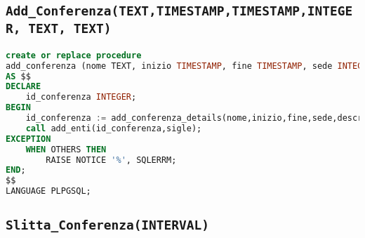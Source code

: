 \subsection{\texttt{Add\_Conferenza(TEXT,TIMESTAMP,TIMESTAMP,INTEGER, TEXT, TEXT)}}
\begin{lstlisting}[language=SQL,style=mystyle]
create or replace procedure 
add_conferenza (nome TEXT, inizio TIMESTAMP, fine TIMESTAMP, sede INTEGER, descrizione TEXT, sigle TEXT,utente INTEGER)
AS $$
DECLARE
	id_conferenza INTEGER;
BEGIN
	id_conferenza := add_conferenza_details(nome,inizio,fine,sede,descrizione,utente);
	call add_enti(id_conferenza,sigle);
EXCEPTION
	WHEN OTHERS THEN
		RAISE NOTICE '%', SQLERRM;
END;
$$ 
LANGUAGE PLPGSQL;
\end{lstlisting}
\subsection{\texttt{Slitta\_Conferenza(INTERVAL)}}
